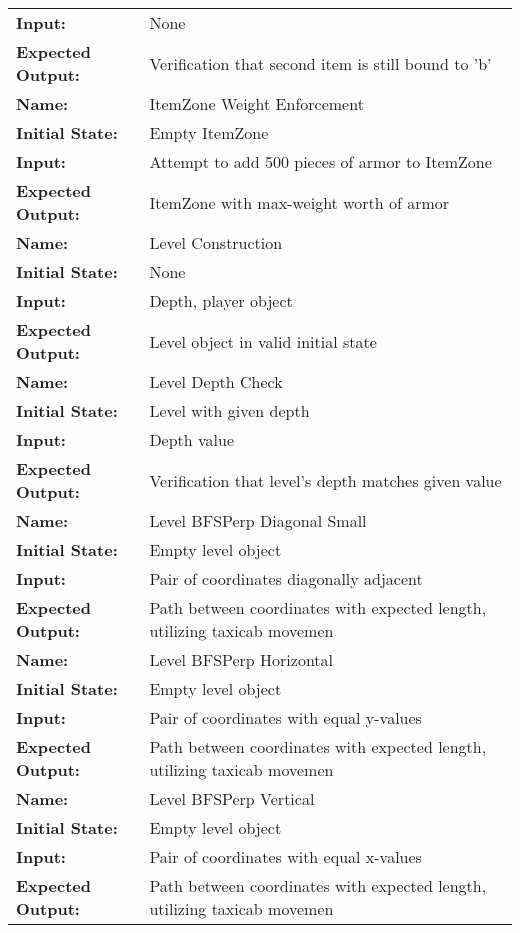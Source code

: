 \documentclass[12pt, titlepage]{article}
\begin{document}
\begin{center}
\begin{longtable}{ l | p{10cm} }
				\textbf{Input:} & None\\
				\textbf{Expected Output:} & Verification that second item is still bound to 'b'\\
				\hline
				\textbf{Name:} & ItemZone Weight Enforcement\\
				\textbf{Initial State:} & Empty ItemZone\\
				\textbf{Input:} & Attempt to add 500 pieces of armor to ItemZone\\
				\textbf{Expected Output:} & ItemZone with max-weight worth of armor\\
				\hline
				\textbf{Name:} & Level Construction\\
				\textbf{Initial State:} & None\\
				\textbf{Input:} & Depth, player object\\
				\textbf{Expected Output:} & Level object in valid initial state\\
				\hline
				\textbf{Name:} & Level Depth Check\\
				\textbf{Initial State:} & Level with given depth\\
				\textbf{Input:} & Depth value\\
				\textbf{Expected Output:} & Verification that level's depth matches given value\\
				\hline
				\textbf{Name:} & Level BFSPerp Diagonal Small\\
				\textbf{Initial State:} & Empty level object\\
				\textbf{Input:} & Pair of coordinates diagonally adjacent\\
				\textbf{Expected Output:} & Path between coordinates with expected length, utilizing taxicab movemen\\
				\hline
				\textbf{Name:} & Level BFSPerp Horizontal\\
				\textbf{Initial State:} & Empty level object\\
				\textbf{Input:} & Pair of coordinates with equal y-values\\
				\textbf{Expected Output:} & Path between coordinates with expected length, utilizing taxicab movemen\\
				\hline
				\textbf{Name:} & Level BFSPerp Vertical\\
				\textbf{Initial State:} & Empty level object\\
				\textbf{Input:} & Pair of coordinates with equal x-values\\
				\textbf{Expected Output:} & Path between coordinates with expected length, utilizing taxicab movemen\\

\end{longtable}
\end{center}
\end{document}
